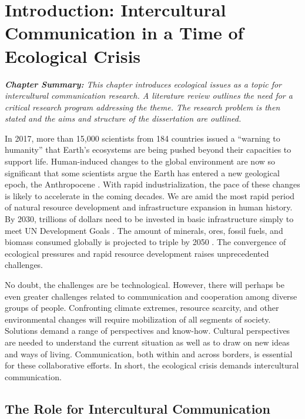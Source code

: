 
\chapter{Introduction: Intercultural Communication in a Time of Ecological Crisis}

\textit{\textbf{Chapter Summary:} This chapter introduces ecological issues as a topic for intercultural communication research. A literature review outlines the need for a critical research program addressing the theme. The research problem is then stated and the aims and structure of the dissertation are outlined.}
\newline

In 2017, more than 15,000 scientists from 184 countries issued a ``warning to humanity'' that Earth's ecosystems are being pushed beyond their capacities to support life. Human-induced changes to the global environment are now so significant that some scientists argue the Earth has entered a new geological epoch, the Anthropocene \citep{Lewis2015a, Waters2016a}. With rapid industrialization, the pace of these changes is likely to accelerate in the coming decades. We are amid the most rapid period of natural resource development and infrastructure expansion in human history. By 2030, trillions of dollars need to be invested in basic infrastructure simply to meet UN Development Goals \citep{UNCTAD2014}. The amount of minerals, ores, fossil fuels, and biomass consumed globally is projected to triple by 2050 \citep{NationalIntelligenceCouncil2013a}. The convergence of ecological pressures and rapid resource development raises unprecedented challenges.

No doubt, the challenges are be technological. However, there will perhaps be even greater challenges related to communication and cooperation among diverse groups of people. Confronting climate extremes, resource scarcity, and other environmental changes will require mobilization of all segments of society. Solutions demand a range of perspectives and know-how. Cultural perspectives are needed to understand the current situation as well as to draw on new ideas and ways of living. Communication, both within and across borders, is essential for these collaborative efforts. In short, the ecological crisis demands intercultural communication.

\section{The Role for Intercultural Communication}

